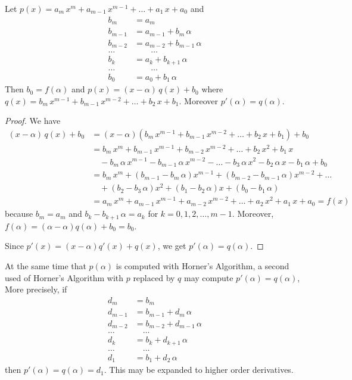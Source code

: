 \begin{theorem}[Horner]
Let $p(x) = a_m\,x^m + a_{m-1}\,x^{m-1} + \ldots + a_1\,x + a_0$ and
\[
\begin{split}
b_m &= a_m \\
b_{m-1} &= a_{m-1} + b_m \, \alpha \\
b_{m-2} &= a_{m-2} + b_{m-1} \, \alpha \\
\ldots & \qquad \ldots \\
b_k &= a_k + b_{k+1} \, \alpha \\
\ldots & \qquad \ldots \\
b_0 &= a_0 + b_1 \, \alpha
\end{split}
\]
Then  $b_0 = f(\alpha)$ and $p(x) = (x - \alpha)\,q(x) + b_0$ where
$q(x) = b_m\,x^{m-1} + b_{m-1}\,x^{m-2} + \ldots + b_2\,x + b_1$.
Moreover $p'(\alpha) = q(\alpha)$.
\label{HornerTh}
\end{theorem}

\begin{proof}
We have
\begin{align*}
(x-\alpha)\,q(x) + b_0 &= (x-\alpha)(b_m\,x^{m-1} + b_{m-1}\,x^{m-2} +
\ldots + b_2\,x + b_1) + b_0\\
&= b_m\,x^m + b_{m-1}\,x^{m-1} + b_{m-2}\,x^{m-2} + \ldots + b_2\,x^2
+ b_1\,x \\
& \quad - b_m\,\alpha\,x^{m-1} - b_{m-1}\,\alpha\,x^{m-2} - \ldots -
b_3\,\alpha\,x^2 - b_2\,\alpha\,x - b_1\,\alpha + b_0\\
&= b_m\,x^m + (b_{m-1} -b_m\,\alpha)x^{m-1} + (b_{m-2}
-b_{m-1}\,\alpha)x^{m-2} + \ldots \\
& \quad + (b_2 - b_3\,\alpha)x^2 + (b_1 - b_2\,\alpha)x +
(b_0 - b_1\,\alpha)\\
&= a_m\,x^m + a_{m-1}\,x^{m-1} + a_{m-2}\,x^{m-2} + \ldots + a_2\,x^2
+ a_1\,x + a_0
= f(x)
\end{align*}
because $b_m = a_m$ and $b_k - b_{k+1}\,\alpha = a_k$ for
$k = 0,1,2,\ldots,m-1$.  Moreover,
$f(\alpha) = (\alpha -\alpha)q(\alpha) + b_0 = b_0$.

Since $p'(x) = (x-\alpha)q'(x) + q(x)$, we get $p'(\alpha) = q(\alpha)$.
\end{proof}

At the same time that $p(\alpha)$ is computed with Horner's Algorithm, a
second used of Horner's Algorithm with $p$ replaced by $q$ may compute
$p'(\alpha) = q(\alpha)$,  More precisely, if
\[
\begin{split}
d_m &= b_m \\
d_{m-1} &= b_{m-1} + d_m \, \alpha \\
d_{m-2} &= b_{m-2} + d_{m-1} \, \alpha \\
\ldots & \quad \ldots \\
d_k &= b_k + d_{k+1} \, \alpha \\
\ldots & \quad \ldots \\
d_1 &= b_1 + d_2 \, \alpha
\end{split}
\]
then $p'(\alpha) = q(\alpha) = d_1$.  This may be expanded to higher
order derivatives.

